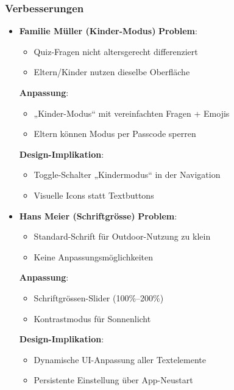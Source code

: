 \documentclass[10pt]{article}
\begin{document}
	\subsubsection{Verbesserungen}
	\begin{itemize}
		\item \textbf{Familie Müller (Kinder-Modus)}
		\subitem \textbf{Problem}: 
		\begin{itemize}
			\item Quiz-Fragen nicht altersgerecht differenziert
			\item Eltern/Kinder nutzen dieselbe Oberfläche
		\end{itemize}
		\subitem \textbf{Anpassung}: 
		\begin{itemize}
			\item „Kinder-Modus“ mit vereinfachten Fragen + Emojis
			\item Eltern können Modus per Passcode sperren
		\end{itemize}
		\subitem \textbf{Design-Implikation}: 
		\begin{itemize}
			\item Toggle-Schalter „Kindermodus“ in der Navigation
			\item Visuelle Icons statt Textbuttons
		\end{itemize}
		
		\item \textbf{Hans Meier (Schriftgrösse)}
		\subitem \textbf{Problem}: 
		\begin{itemize}
			\item Standard-Schrift für Outdoor-Nutzung zu klein
			\item Keine Anpassungsmöglichkeiten
		\end{itemize}
		\subitem \textbf{Anpassung}: 
		\begin{itemize}
			\item Schriftgrössen-Slider (100\%–200\%)
			\item Kontrastmodus für Sonnenlicht
		\end{itemize}
		\subitem \textbf{Design-Implikation}: 
		\begin{itemize}
			\item Dynamische UI-Anpassung aller Textelemente
			\item Persistente Einstellung über App-Neustart
		\end{itemize}
		

\end{itemize}
\end{document}
